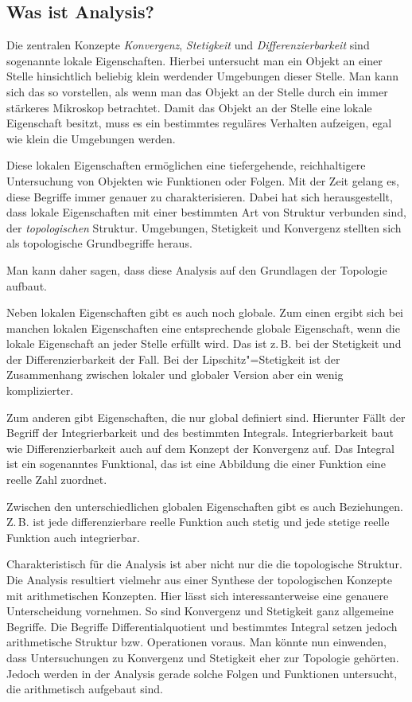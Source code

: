 \documentclass[a4paper,10pt,fleqn,twocolumn,twoside]{scrartcl}
\begin{document}
\subsection{Was ist Analysis?}

Die zentralen Konzepte \emph{Konvergenz}, \emph{Stetigkeit}
und \emph{Differenzierbarkeit}
sind sogenannte lokale Eigenschaften. Hierbei untersucht man ein
Objekt an einer Stelle hinsichtlich beliebig klein werdender Umgebungen
dieser Stelle. Man kann sich das so vorstellen, als wenn man das
Objekt an der Stelle durch ein immer stärkeres Mikroskop betrachtet.
Damit das Objekt an der Stelle eine lokale Eigenschaft besitzt,
muss es ein bestimmtes reguläres Verhalten aufzeigen, egal wie klein
die Umgebungen werden.

Diese lokalen Eigenschaften ermöglichen eine tiefergehende,
reichhaltigere Untersuchung von Objekten wie Funktionen oder Folgen.
Mit der Zeit gelang es, diese Begriffe immer genauer zu
charakterisieren. Dabei hat sich herausgestellt, dass lokale
Eigenschaften mit einer bestimmten Art von Struktur verbunden sind,
der \emph{topologischen} Struktur. Umgebungen, Stetigkeit und
Konvergenz stellten sich als topologische Grundbegriffe heraus.

Man kann daher sagen, dass diese Analysis auf den Grundlagen der
Topologie aufbaut.

Neben lokalen Eigenschaften gibt es auch noch globale. Zum einen
ergibt sich bei manchen lokalen Eigenschaften eine entsprechende
globale Eigenschaft, wenn die lokale Eigenschaft an jeder Stelle
erfüllt wird. Das ist z.\,B. bei der Stetigkeit und der
Differenzierbarkeit der Fall. Bei der Lipschitz"=Stetigkeit
ist der Zusammenhang zwischen lokaler und globaler Version aber
ein wenig komplizierter.

Zum anderen gibt Eigenschaften, die nur global definiert sind.
Hierunter Fällt der Begriff der Integrierbarkeit und des bestimmten
Integrals. Integrierbarkeit baut wie Differenzierbarkeit auch
auf dem Konzept der Konvergenz auf. Das Integral ist ein sogenanntes
Funktional, das ist eine Abbildung die einer Funktion eine reelle
Zahl zuordnet.

Zwischen den unterschiedlichen globalen Eigenschaften gibt es auch
Beziehungen. Z.\,B. ist jede differenzierbare reelle Funktion auch
stetig und jede stetige reelle Funktion auch integrierbar.

Charakteristisch für die Analysis ist aber nicht nur die die
topologische Struktur. Die Analysis resultiert vielmehr aus einer
Synthese der topologischen Konzepte mit arithmetischen Konzepten.
Hier lässt sich interessanterweise eine genauere Unterscheidung
vornehmen. So sind Konvergenz und Stetigkeit ganz allgemeine Begriffe.
Die Begriffe Differentialquotient und bestimmtes Integral setzen
jedoch arithmetische Struktur bzw. Operationen voraus. Man könnte
nun einwenden, dass Untersuchungen zu Konvergenz und Stetigkeit eher
zur Topologie gehörten. Jedoch werden in der Analysis gerade solche
Folgen und Funktionen untersucht, die arithmetisch aufgebaut sind.
\end{document}
